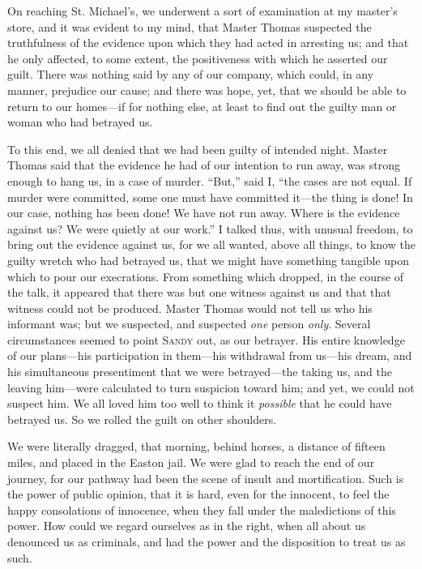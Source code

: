 On reaching St. Michael's, we underwent a sort of examination at my
master's store, and it was evident to my mind, that Master Thomas
suspected the truthfulness of the evidence upon which they had acted in
arresting us; and that he only affected, to some extent, the
positiveness with which he asserted our guilt. There was nothing said by
any of our company, which {}could, in any manner, prejudice our cause;
and there was hope, yet, that we should be able to return to our
homes---if for nothing else, at least to find out the guilty man or
woman who had betrayed us.

To this end, we all denied that we had been guilty of intended night.
Master Thomas said that the evidence he had of our intention to run
away, was strong enough to hang us, in a case of murder. ``But,'' said
I, ``the cases are not equal. If murder were committed, some one must
have committed it---the thing is done! In our case, nothing has been
done! We have not run away. Where is the evidence against us? We were
quietly at our work.'' I talked thus, with unusual freedom, to bring out
the evidence against us, for we all wanted, above all things, to know
the guilty wretch who had betrayed us, that we might have something
tangible upon which to pour our execrations. From something which
dropped, in the course of the talk, it appeared that there was but one
witness against us and that that witness could not be produced. Master
Thomas would not tell us who his informant was; but we suspected, and
suspected \emph{one} person \emph{only}. Several circumstances seemed to
point \textsc{Sandy} out, as our betrayer. His entire knowledge of our
plans---his participation in them---his withdrawal from us---his dream,
and his simultaneous presentiment that we were betrayed---the taking us,
and the leaving him---were calculated to turn suspicion toward him; and
yet, we could not suspect him. We all loved him too well to think it
\emph{possible} that he could have betrayed us. So we rolled the guilt
on other shoulders.

{}We were literally dragged, that morning, behind horses, a distance of
fifteen miles, and placed in the Easton jail. We were glad to reach the
end of our journey, for our pathway had been the scene of insult and
mortification. Such is the power of public opinion, that it is hard,
even for the innocent, to feel the happy consolations of innocence, when
they fall under the maledictions of this power. How could we regard
ourselves as in the right, when all about us denounced us as criminals,
and had the power and the disposition to treat us as such.

